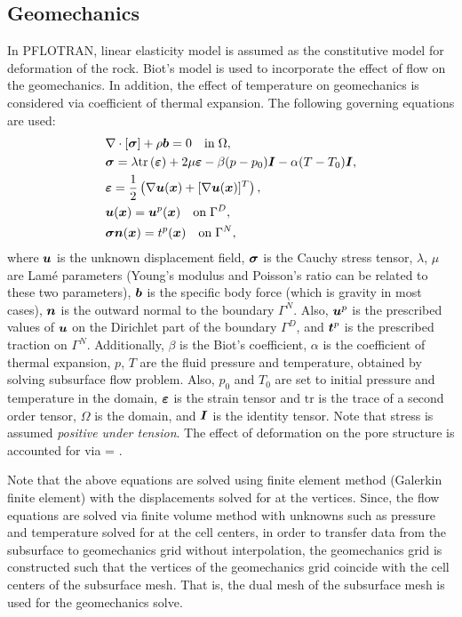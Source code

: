 \subsection{Geomechanics}
In PFLOTRAN, linear elasticity model is assumed as the constitutive model for deformation of the rock.
Biot's model is used to incorporate the effect of flow on the geomechanics. In addition, the effect of temperature on geomechanics is considered via coefficient of thermal expansion. The following governing equations are used:
\SEQ
\begin{align}
& \nabla \cdot [\boldsymbol{\sigma}] + \rho \boldsymbol{b} = 0 \quad \mathrm{in} \; \Omega, \label{Eq:mom}\\ 
& \boldsymbol{\sigma} = \lambda \text{tr}\left(\boldsymbol{\varepsilon}\right) + 2\mu \boldsymbol{\varepsilon} - \beta (p - p_0) \boldsymbol{I} - \alpha (T - T_0) \boldsymbol{I}, \\
& \boldsymbol{\varepsilon} = \frac{1}{2} \left(\nabla\boldsymbol{u}(\boldsymbol{x}) + [\nabla \boldsymbol{u}(\boldsymbol{x})]^{T}  \right), \\ 
&\boldsymbol{u}(\boldsymbol{x}) = \boldsymbol{u}^p(\boldsymbol{x}) \quad \mathrm{on} \; \Gamma^D,\label{eqn:diri}\\
& \boldsymbol{\sigma}\boldsymbol{n}(\boldsymbol{x}) = t^p(\boldsymbol{x}) \quad \mathrm{on} \; \Gamma^N, \label{eqn:neu}
\end{align}
\SEN
 where $\boldsymbol{u}$ is the unknown displacement field, $\boldsymbol{\sigma}$ is the Cauchy stress tensor,   $\lambda$, $\mu$ are Lam\'{e} parameters (Young's modulus and Poisson's ratio can be related to these two parameters), $\boldsymbol{b}$ is the specific body force (which is gravity in most cases), $\boldsymbol{n}$ is the outward normal to the boundary $\Gamma^N$. Also, $\boldsymbol{u}^p$ is the prescribed values of $\boldsymbol{u}$ on the Dirichlet part of the boundary $\Gamma^D$, and $\boldsymbol{t}^p$ is the prescribed traction on $\Gamma^N$. Additionally, $\beta$ is the Biot's coefficient, $\alpha$ is the coefficient of thermal expansion, $p$, $T$ are the fluid pressure and temperature, obtained by solving subsurface flow problem. Also, $p_0$ and $T_0$ are set to initial  pressure and temperature in the domain, $\boldsymbol{\varepsilon}$ is the strain tensor and $\text{tr}$ is the trace of a second order tensor, $\Omega$ is the domain, and $\boldsymbol{I}$ is the identity tensor. Note that stress is assumed \textit{positive under tension}.
The effect of deformation on the pore structure is accounted for via 
\BA
\phi = .
\EA

Note that the above equations are solved using finite element method (Galerkin finite element) with the displacements solved for at the vertices. Since, the flow equations are solved via finite volume method with unknowns such as pressure and temperature solved for at the cell centers, in order to transfer data from the subsurface to geomechanics grid without interpolation, the geomechanics grid is constructed such that the vertices of the geomechanics grid coincide with the cell centers of the subsurface mesh. That is, the dual mesh of the subsurface mesh is used for the geomechanics solve.


